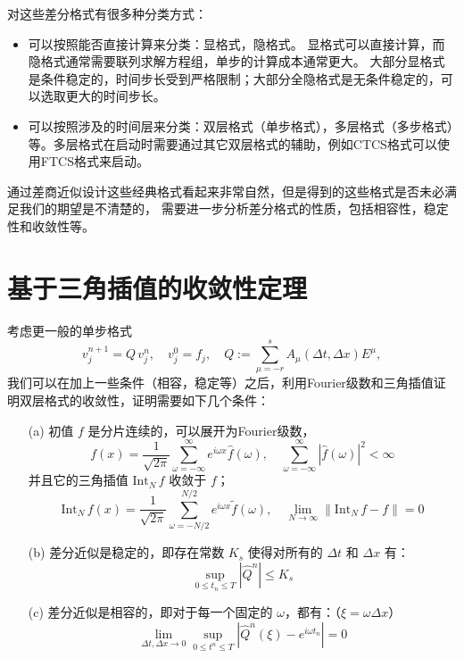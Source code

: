 对这些差分格式有很多种分类方式：
\begin{itemize}
    \item 可以按照能否直接计算来分类：显格式，隐格式。
          显格式可以直接计算，而隐格式通常需要联列求解方程组，单步的计算成本通常更大。
          大部分显格式是条件稳定的，时间步长受到严格限制；大部分全隐格式是无条件稳定的，可以选取更大的时间步长。
    \item 可以按照涉及的时间层来分类：双层格式（单步格式），多层格式（多步格式）等。多层格式在启动时需要通过其它双层格式的辅助，例如CTCS格式可以使用FTCS格式来启动。
\end{itemize}

通过差商近似设计这些经典格式看起来非常自然，但是得到的这些格式是否未必满足我们的期望是不清楚的，
需要进一步分析差分格式的性质，包括相容性，稳定性和收敛性等。

\section{基于三角插值的收敛性定理}

考虑更一般的单步格式
\[
    v_j^{n+1} = Q\,v_j^n, \quad v_j^0 = f_j,\quad Q := \sum_{\mu = -r}^s A_\mu(\Delta t,\Delta x) E^\mu,
\]
我们可以在加上一些条件（相容，稳定等）之后，利用Fourier级数和三角插值证明双层格式的收敛性，证明需要如下几个条件：
\begin{enumerate}
    \item[(a)] 初值 $f$ 是分片连续的，可以展开为Fourier级数，
          \[
              f(x) = \frac{1}{\sqrt{2\pi}} \sum_{\omega = -\infty}^{\infty} e^{i \omega  x} \hat{f}(\omega ),\quad \sum_{\omega = -\infty}^{\infty} |\hat{f}(\omega )|^2 < \infty
          \]
          并且它的三角插值 $\text{Int}_N\,f$ 收敛于 $f$；
          \[
              \text{Int}_N\,f (x) = \frac{1}{\sqrt{2\pi}} \sum_{\omega = -N/2}^{N/2} e^{i \omega  x} \tilde{f}(\omega ),
              \quad \lim_{N \to \infty} \| \text{Int}_N\,f  - f \| = 0
          \]
    \item[(b)] 差分近似是稳定的，即存在常数 $K_s$ 使得对所有的 $\Delta t$ 和 $\Delta x$ 有：
          \[
              \sup_{0 \le t_n \le T} |\widehat{Q}^n| \le K_s
          \]
    \item[(c)] 差分近似是相容的，即对于每一个固定的 $\omega $，都有：（$\xi = \omega \Delta x$）
          \[
              \lim_{\Delta t,\Delta x \to 0} \sup_{0 \le t^n \le T} |\widehat{Q}^n(\xi) - e^{i \omega  t_n}| = 0
          \]
\end{enumerate}


